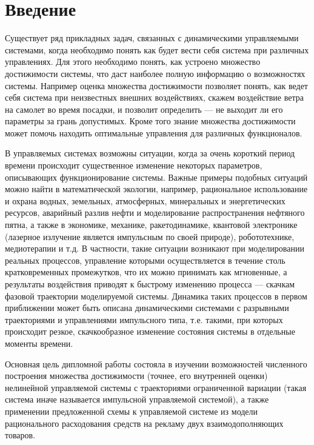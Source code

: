 \chapter*{Введение}
\label{intro}

Существует ряд прикладных задач, связанных с динамическими
управляемыми системами, когда необходимо понять как будет вести себя
система при различных управлениях. Для этого необходимо понять, как
устроено множество достижимости системы, что даст наиболее полную
информацию о возможностях системы. Например оценка множества
достижимости позволяет понять, как ведет себя система при неизвестных
внешних воздействиях, скажем воздействие ветра на самолет во время 
посадки, и позволит определить --- не выходит ли его параметры за грань 
допустимых. Кроме того знание множества достижимости может помочь находить 
оптимальные управления для различных функционалов.

В управляемых системах возможны ситуации, когда за
очень короткий период времени происходит существенное изменение
некоторых параметров, описывающих функционирование системы.  Важные
примеры подобных ситуаций можно найти в математической экологии,
например, рациональное использование и охрана водных, земельных,
атмосферных, минеральных и энергетических ресурсов, аварийный разлив
нефти и моделирование распространения нефтяного пятна,  а также в
экономике, механике, ракетодинамике,  квантовой электронике (лазерное
излучение является импульсным по своей природе), робототехнике,
медиотерапии  и т.д. В частности, такие ситуации возникают при
моделировании реальных процессов, управление которыми осуществляется в
течение столь кратковременных промежутков, что их можно принимать как
мгновенные, а результаты воздействия приводят к быстрому изменению
процесса --- скачкам фазовой траектории моделируемой системы. Динамика
таких процессов в первом приближении может быть описана динамическими
системами  с разрывными траекториями и управлениями импульсного типа,
т.е. такими, при которых происходит резкое, скачкообразное изменение
состояния системы в отдельные моменты времени. 

Основная цель дипломной работы состояла в изучении возможностей
численного построения множества достижимости (точнее, его внутренней
оценки) нелинейной управляемой системы с траекториями ограниченной
вариации (такая система иначе называется импульсной управляемой
системой), а также применении предложенной схемы к управляемой системе
из модели рационального расходования средств на рекламу двух
взаимодополняющих товаров.
